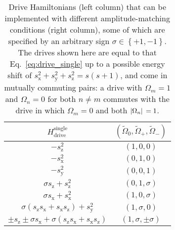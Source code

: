 \documentclass[nofootinbib,twocolumn]{revtex4-2}
\renewcommand{\t}{\text} %
\newcommand{\p}[1]{\left(#1\right)} %
\renewcommand{\set}[1]{\left\{#1\right\}} %
\newcommand{\1}{\mathds{1}}
\newcommand{\x}{\text{x}}
\newcommand{\y}{\text{y}}
\newcommand{\z}{\text{z}}
\begin{document}
\begin{table}
\centering
\caption{
Drive Hamiltonians (left column) that can be implemented with different amplitude-matching conditions (right column), some of which are specified by an arbitrary sign $\sigma\in\set{+1,-1}$.
The drives shown here are equal to that Eq.~\eqref{eq:drive_single} up to a possible energy shift of $s_\x^2+s_\y^2+s_\z^2=s(s+1)$, and come in mutually commuting pairs: a drive with $\Omega_m=1$ and $\Omega_n=0$ for both $n\ne m$ commutes with the drive in which $\Omega_m=0$ and both $\abs*{\Omega_n}=1$.
}
\vspace{.5em}
\begin{tabular}{c|c}
  $H_{\t{drive}}^{\t{single}}$
  & $(\tilde\Omega_0,\tilde\Omega_+,\tilde\Omega_-)$
  \\ \hline\hline
  $-s_\z^2$ & $\p{1,0,0}$
  \\ \hline
   $-s_\x^2$ & $\p{0,1,0}$
  \\ \hline
  $-s_\y^2$ & $\p{0,0,1}$
  \\ \hline
  $\sigma s_\z + s_\z^2$ & $\p{0,1,\sigma}$
  \\ \hline
  $\sigma s_\x + s_\x^2$ & $\p{1,0,\sigma}$
  \\ \hline
  $\sigma\p{s_\z s_\x+s_\x s_\z} + s_\y^2$ & $\p{1,\sigma,0}$
  \\ \hline
  $\pm s_\z \pm \sigma s_\x + \sigma \p{s_\z s_\x + s_\x s_\z}$
  & $\p{1,\sigma,\pm\sigma}$
\end{tabular}
\label{tab:drives}
\end{table}
\end{document}
